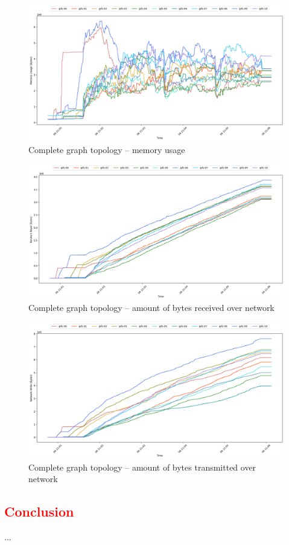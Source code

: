 \begin{figure}[H]
\includegraphics[width=\linewidth]{figures/graph-complete/mem_usage.png}
\caption{Complete graph topology -- memory usage}
\end{figure}
\begin{figure}[H]
\includegraphics[width=\linewidth]{figures/graph-complete/net_read.png}
\caption{Complete graph topology -- amount of bytes received over network}
\end{figure}
\begin{figure}[H]
\includegraphics[width=\linewidth]{figures/graph-complete/net_write.png}
\caption{Complete graph topology -- amount of bytes transmitted over network}
\end{figure}


\subsection{\textcolor{red}{Conclusion}}
...



